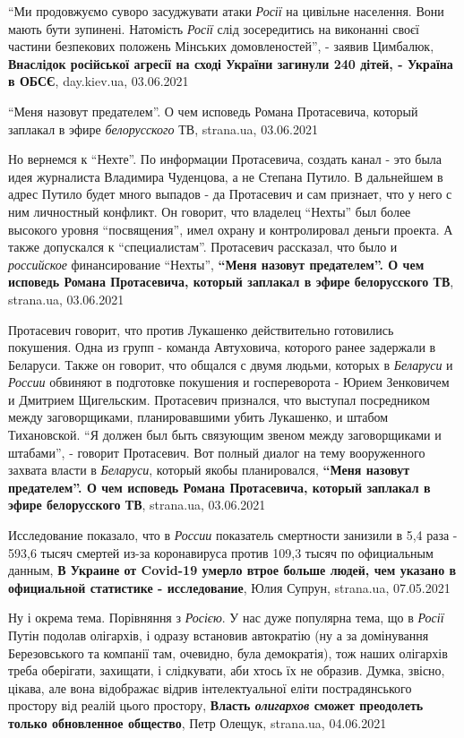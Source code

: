 \enquote{Ми продовжуємо суворо засуджувати атаки \emph{Росії} на цивільне
населення. Вони мають бути зупинені. Натомість \emph{Росії} слід зосередитись
на виконанні своєї частини безпекових положень Мінських домовленостей}, -
заявив Цимбалюк,
\textbf{Внаслідок російської агресії на сході України загинули 240 дітей, -
Україна в ОБСЄ}, day.kiev.ua, 03.06.2021

\enquote{Меня назовут предателем}. О чем исповедь Романа Протасевича, который заплакал в эфире \emph{белорусского} ТВ,
strana.ua, 03.06.2021

Но вернемся к \enquote{Нехте}. По информации Протасевича, создать канал - это была идея
журналиста Владимира Чуденцова, а не Степана Путило. В дальнейшем в адрес
Путило будет много выпадов - да Протасевич и сам признает, что у него с ним
личностный конфликт. Он говорит, что владелец \enquote{Нехты} был более высокого
уровня \enquote{посвящения}, имел охрану и контролировал деньги проекта. А также
допускался к \enquote{специалистам}. Протасевич рассказал, что было и \emph{российское}
финансирование \enquote{Нехты},
\textbf{\enquote{Меня назовут предателем}. О чем исповедь Романа Протасевича, который заплакал в эфире белорусского ТВ},
strana.ua, 03.06.2021

Протасевич говорит, что против Лукашенко действительно готовились покушения.
Одна из групп - команда Автуховича, которого ранее задержали в Беларуси.  Также
он говорит, что общался с двумя людьми, которых в \emph{Беларуси} и \emph{России} обвиняют в
подготовке покушения и госпереворота - Юрием Зенковичем и Дмитрием Щигельским.
Протасевич признался, что выступал посредником между заговорщиками,
планировавшими убить Лукашенко, и штабом Тихановской.  \enquote{Я должен был быть
связующим звеном между заговорщиками и штабами}, - говорит Протасевич. Вот
полный диалог на тему вооруженного захвата власти в \emph{Беларуси}, который якобы
планировался,
\textbf{\enquote{Меня назовут предателем}. О чем исповедь Романа Протасевича, который заплакал в эфире белорусского ТВ},
strana.ua, 03.06.2021

Исследование показало, что в \emph{России} показатель смертности занизили в 5,4
раза - 593,6 тысяч смертей из-за коронавируса против 109,3 тысяч по официальным
данным,
\textbf{В Украине от Covid-19 умерло втрое больше людей, чем указано в официальной статистике - исследование},
Юлия Супрун, strana.ua, 07.05.2021

Ну і окрема тема. Порівняння з \emph{Росією}. У нас дуже популярна тема, що в
\emph{Росії} Путін подолав олігархів, і одразу встановив автократію (ну а за
домінування Березовського та компанії там, очевидно, була демократія), тож
наших олігархів треба оберігати, захищати, і слідкувати, аби хтось їх не
образив. Думка, звісно, цікава, але вона відображає відрив інтелектуальної
еліти пострадянського простору від реалій цього простору,
\textbf{Власть \emph{олигархов} сможет преодолеть только обновленное общество},
Петр Олещук, strana.ua, 04.06.2021

